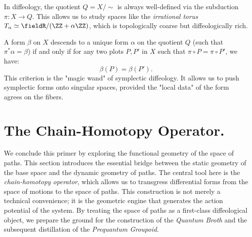 \begin{article}
  In diffeology,
  the quotient $Q = X/\!\!\sim$ is always well-defined via the subduction $\pi: X \to Q$.
  This allows us to study spaces like the \emph{irrational torus} $T_\alpha \simeq \fieldR / (\ZZ + \alpha\ZZ)$,
  which is topologically coarse but diffeologically rich.
  
  A form $\beta$ on $X$ descends to a unique form $\alpha$ on the quotient $Q$
  (such that $\pi^*\alpha = \beta$)
  if and only if for any two plots $P, P'$ in $X$ such that $\pi \circ P = \pi \circ P'$,
  we have:
  \[
    \beta(P) = \beta(P').
    \]
  This criterion is the "magic wand" of symplectic diffeology.
  It allows us to push symplectic forms onto singular spaces,
  provided the "local data" of the form agrees on the fibers.
\end{article}

\section{The Chain-Homotopy Operator.}
\label{sec:The Chain-Homotopy Operator}

We conclude this primer by exploring the functional geometry of the space of paths.
This section introduces the essential bridge between the static geometry of the base space and the dynamic geometry of paths.
The central tool here is the \emph{chain-homotopy operator},
which allows us to transgress differential forms from the space of motions to the space of paths.
This construction is not merely a technical convenience;
it is the geometric engine that generates the action potential of the system.
By treating the space of paths as a first-class diffeological object,
we prepare the ground for the construction of the \emph{Quantum Broth} and the subsequent distillation of the \emph{Prequantum Groupoid}.

